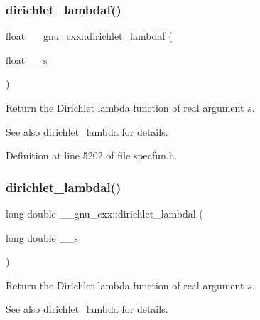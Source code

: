 \subsubsection{\texorpdfstring{dirichlet\+\_\+lambdaf()}{dirichlet\_lambdaf()}}
{\footnotesize\ttfamily float \+\_\+\+\_\+gnu\+\_\+cxx\+::dirichlet\+\_\+lambdaf (\begin{DoxyParamCaption}\item[{float}]{\+\_\+\+\_\+s }\end{DoxyParamCaption})\hspace{0.3cm}{\ttfamily [inline]}}

Return the Dirichlet lambda function of real argument $ s $.

\begin{DoxySeeAlso}{See also}
\hyperlink{group__gnu__math__spec__func_ga06842a81bdcabf9c62252dde992d42ee}{dirichlet\+\_\+lambda} for details. 
\end{DoxySeeAlso}


Definition at line 5202 of file specfun.\+h.

\mbox{\label{group__gnu__math__spec__func_gab28d06c4e3c7457f1fa3663168678fb2}} 
\subsubsection{\texorpdfstring{dirichlet\+\_\+lambdal()}{dirichlet\_lambdal()}}
{\footnotesize\ttfamily long double \+\_\+\+\_\+gnu\+\_\+cxx\+::dirichlet\+\_\+lambdal (\begin{DoxyParamCaption}\item[{long double}]{\+\_\+\+\_\+s }\end{DoxyParamCaption})\hspace{0.3cm}{\ttfamily [inline]}}

Return the Dirichlet lambda function of real argument $ s $.

\begin{DoxySeeAlso}{See also}
\hyperlink{group__gnu__math__spec__func_ga06842a81bdcabf9c62252dde992d42ee}{dirichlet\+\_\+lambda} for details. 
\end{DoxySeeAlso}


